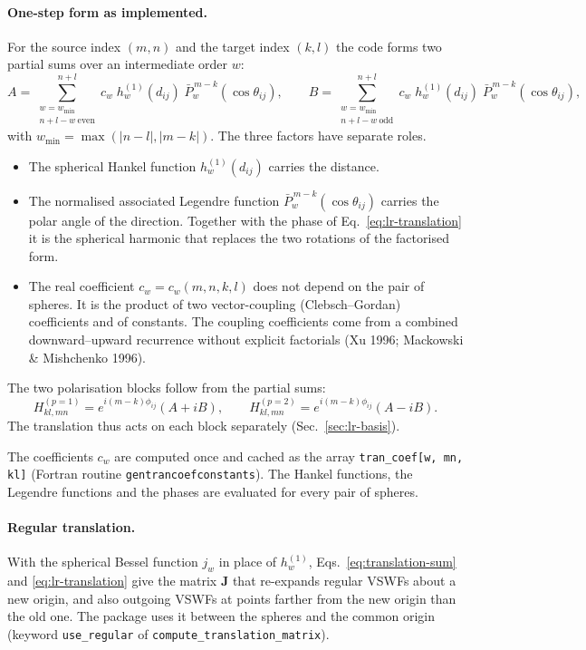 \documentclass[11pt,a4paper]{article}
\begin{document}
\paragraph{One-step form as implemented.}
For the source index $(m, n)$ and the target index $(k, l)$ the code forms two partial sums over an intermediate order $w$:
\begin{equation}
  A = \sum_{\substack{w = w_\mathrm{min} \\ n+l-w\ \mathrm{even}}}^{n+l} c_w\; h_w^{(1)}(d_{ij})\; \bar{P}_w^{\,m-k}(\cos\theta_{ij}), \qquad
  B = \sum_{\substack{w = w_\mathrm{min} \\ n+l-w\ \mathrm{odd}}}^{n+l} c_w\; h_w^{(1)}(d_{ij})\; \bar{P}_w^{\,m-k}(\cos\theta_{ij}),
  \label{eq:translation-sum}
\end{equation}
with $w_\mathrm{min} = \max(|n-l|, |m-k|)$.
The three factors have separate roles.
\begin{itemize}[nosep]
  \item The spherical Hankel function $h_w^{(1)}(d_{ij})$ carries the distance.
  \item The normalised associated Legendre function $\bar{P}_w^{\,m-k}(\cos\theta_{ij})$ carries the polar angle of the direction. Together with the phase of Eq.~\eqref{eq:lr-translation} it is the spherical harmonic that replaces the two rotations of the factorised form.
  \item The real coefficient $c_w = c_w(m, n, k, l)$ does not depend on the pair of spheres. It is the product of two vector-coupling (Clebsch--Gordan) coefficients and of constants. The coupling coefficients come from a combined downward--upward recurrence without explicit factorials (Xu 1996; Mackowski \& Mishchenko 1996).
\end{itemize}
The two polarisation blocks follow from the partial sums:
\begin{equation}
  H_{kl,mn}^{(p=1)} = e^{i(m-k)\phi_{ij}} \left(A + iB\right), \qquad
  H_{kl,mn}^{(p=2)} = e^{i(m-k)\phi_{ij}} \left(A - iB\right).
  \label{eq:lr-translation}
\end{equation}
The translation thus acts on each block separately (Sec.~\ref{sec:lr-basis}).

The coefficients $c_w$ are computed once and cached as the array \texttt{tran\_coef[w, mn, kl]} (Fortran routine \texttt{gentrancoefconstants}).
The Hankel functions, the Legendre functions and the phases are evaluated for every pair of spheres.

\paragraph{Regular translation.}
With the spherical Bessel function $j_w$ in place of $h_w^{(1)}$, Eqs.~\eqref{eq:translation-sum} and \eqref{eq:lr-translation} give the matrix $\mathbf{J}$ that re-expands regular VSWFs about a new origin, and also outgoing VSWFs at points farther from the new origin than the old one.
The package uses it between the spheres and the common origin (keyword \texttt{use\_regular} of \texttt{compute\_translation\_matrix}).
\end{document}
